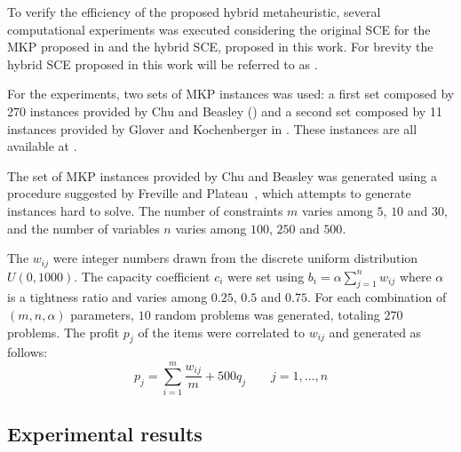 To verify the efficiency of the proposed hybrid metaheuristic, several computational
experiments was executed considering the original SCE for the MKP proposed in
\cite{baroni2015shuffled} and the hybrid SCE, proposed in this work.
For brevity the hybrid SCE proposed in this work will be referred to as \scecore.

For the experiments, two sets of MKP instances was used:
a first set composed by 270 instances provided by Chu and Beasley (\cite{Chu-Beasley-1998})
and a second set composed by 11 instances provided by Glover and Kochenberger in
\cite{glover1996critical}.
These instances are all available at \cite{ORLibrary}.

The set of MKP instances provided by Chu and Beasley was generated using a
procedure suggested by Freville and Plateau~\cite{freville1994efficient}, which
attempts to generate instances hard to solve.
The number of constraints $m$ varies among $5$, $10$ and $30$, and the number
of variables $n$ varies among $100$, $250$ and $500$.

The $w_{ij}$ were integer numbers drawn from the discrete uniform distribution
$U(0, 1000)$.
The capacity coefficient $c_i$ were set using
$b_i = \alpha\sum_{j=1}^{n} w_{ij}$ where $\alpha$ is a tightness ratio and
varies among $0.25$, $0.5$ and $0.75$.
For each combination of $(m,n,\alpha)$ parameters, $10$ random problems was generated,
totaling $270$ problems.
The profit $p_j$ of the items were correlated to $w_{ij}$ and generated as follows:
\begin{displaymath}
  p_j = \sum_{i=1}^m \frac{w_{ij}}{m} + 500q_j \qquad j = 1, \ldots, n
\end{displaymath}



\subsection{Experimental results}

